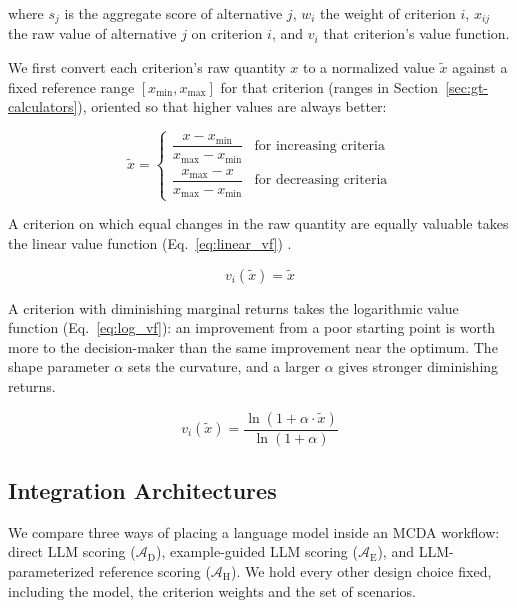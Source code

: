 \documentclass[final,3p,times]{elsarticle}
\begin{document}
\noindent where $s_j$ is the aggregate score of alternative $j$, $w_i$ the weight of criterion $i$, $x_{ij}$ the raw value of alternative $j$ on criterion $i$, and $v_i$ that criterion's value function.

We first convert each criterion's raw quantity $x$ to a normalized value $\tilde{x}$ against a fixed reference range $[x_{\min}, x_{\max}]$ for that criterion (ranges in Section~\ref{sec:gt-calculators}), oriented so that higher values are always better:

\begin{equation}
\label{eq:norm_x}
\tilde{x} =
\begin{cases}
\dfrac{x - x_{\min}}{x_{\max} - x_{\min}} & \text{for increasing criteria}\\[4mm]
\dfrac{x_{\max} - x}{x_{\max} - x_{\min}} & \text{for decreasing criteria}
\end{cases}
\end{equation}

A criterion on which equal changes in the raw quantity are equally valuable takes the linear value function (Eq.~\ref{eq:linear_vf}) \cite{dyer1979,keeneyraiffa1976}.

\begin{equation}
\label{eq:linear_vf}
v_i(\tilde{x}) = \tilde{x}
\end{equation}

A criterion with diminishing marginal returns takes the logarithmic value function (Eq.~\ref{eq:log_vf}): an improvement from a poor starting point is worth more to the decision-maker than the same improvement near the optimum. The shape parameter $\alpha$ sets the curvature, and a larger $\alpha$ gives stronger diminishing returns.

\begin{equation}
\label{eq:log_vf}
v_i(\tilde{x}) = \frac{\ln\!\left(1 + \alpha \cdot \tilde{x}\right)}{\ln(1 + \alpha)}
\end{equation}

\FloatBarrier
\subsection{Integration Architectures}
\label{sec:architectures}

We compare three ways of placing a language model inside an MCDA workflow: direct LLM scoring ($\mathcal{A}_{\text{D}}$), example-guided LLM scoring ($\mathcal{A}_{\text{E}}$), and LLM-parameterized reference scoring ($\mathcal{A}_{\text{H}}$). We hold every other design choice fixed, including the model, the criterion weights and the set of scenarios.
\end{document}
